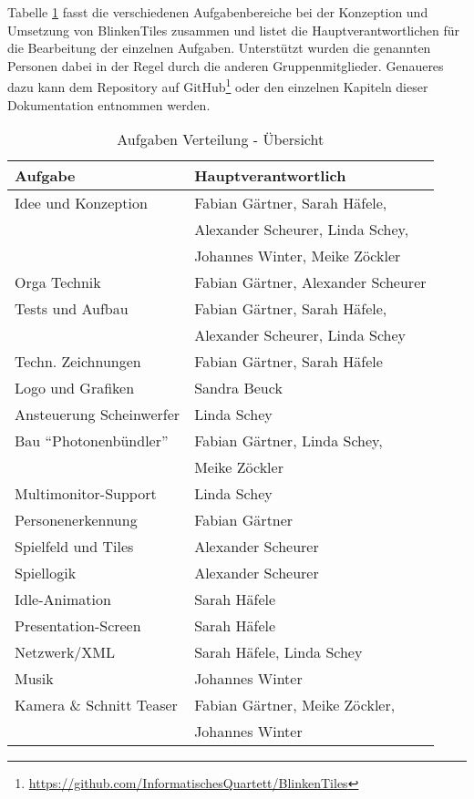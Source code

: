 
Tabelle \ref{tab:aufgaben} fasst die verschiedenen Aufgabenbereiche bei der Konzeption und Umsetzung von BlinkenTiles zusammen und listet die Hauptverantwortlichen für die Bearbeitung der einzelnen Aufgaben. Unterstützt wurden die genannten Personen dabei in der Regel durch die anderen Gruppenmitglieder. Genaueres dazu kann dem Repository auf GitHub\footnote{\url{https://github.com/InformatischesQuartett/BlinkenTiles}} oder den einzelnen Kapiteln dieser Dokumentation entnommen werden.

\vspace{0.8em}

\begin{table}[hc]
\begin{center}
\begin{tabular}[hc]{l|l}
\textbf{Aufgabe} & \textbf{Hauptverantwortlich}\\
\hline
Idee und Konzeption& Fabian Gärtner, Sarah Häfele,\\
&Alexander Scheurer, Linda Schey,\\
&Johannes Winter, Meike Zöckler\\\hline
Orga Technik& Fabian Gärtner, Alexander Scheurer\\\hline
Tests und Aufbau& Fabian Gärtner, Sarah Häfele,\\
&Alexander Scheurer, Linda Schey\\\hline
Techn. Zeichnungen& Fabian Gärtner, Sarah Häfele\\\hline
Logo und Grafiken& Sandra Beuck\\\hline
Ansteuerung Scheinwerfer&Linda Schey\\\hline
Bau \enquote{Photonenbündler}&Fabian Gärtner, Linda Schey,\\&Meike Zöckler\\\hline
Multimonitor-Support& Linda Schey\\\hline
Personenerkennung& Fabian Gärtner\\\hline
Spielfeld und Tiles& Alexander Scheurer\\\hline
Spiellogik& Alexander Scheurer\\\hline
Idle-Animation& Sarah Häfele\\\hline
Presentation-Screen& Sarah Häfele\\\hline
Netzwerk/XML& Sarah Häfele, Linda Schey\\\hline
Musik& Johannes Winter\\\hline
Kamera \& Schnitt Teaser&Fabian Gärtner, Meike Zöckler,\\&Johannes Winter\\
\hline
\end{tabular}
\caption{Aufgaben Verteilung - Übersicht}
\label{tab:aufgaben}
\end{center}
\end{table}
